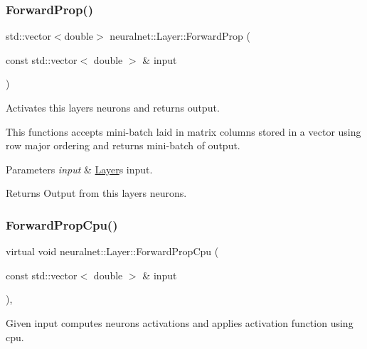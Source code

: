 \subsubsection{\texorpdfstring{Forward\+Prop()}{ForwardProp()}}
{\footnotesize\ttfamily std\+::vector$<$double$>$ neuralnet\+::\+Layer\+::\+Forward\+Prop (\begin{DoxyParamCaption}\item[{const std\+::vector$<$ double $>$ \&}]{input }\end{DoxyParamCaption})\hspace{0.3cm}{\ttfamily [inline]}}



Activates this layer\textquotesingle{}s neurons and returns output. 

This functions accepts mini-\/batch laid in matrix columns stored in a vector using row major ordering and returns mini-\/batch of output.


\begin{DoxyParams}{Parameters}
{\em input} & \hyperlink{classneuralnet_1_1Layer}{Layer}\textquotesingle{}s input. \\
\hline
\end{DoxyParams}
\begin{DoxyReturn}{Returns}
Output from this layer\textquotesingle{}s neurons. 
\end{DoxyReturn}
\mbox{\label{classneuralnet_1_1Layer_a3aa08517de6a73640cd0e511c134b231}} 
\subsubsection{\texorpdfstring{Forward\+Prop\+Cpu()}{ForwardPropCpu()}}
{\footnotesize\ttfamily virtual void neuralnet\+::\+Layer\+::\+Forward\+Prop\+Cpu (\begin{DoxyParamCaption}\item[{const std\+::vector$<$ double $>$ \&}]{input }\end{DoxyParamCaption})\hspace{0.3cm}{\ttfamily [protected]}, {}}



Given input computes neurons\textquotesingle{} activations and applies activation function using cpu. 

